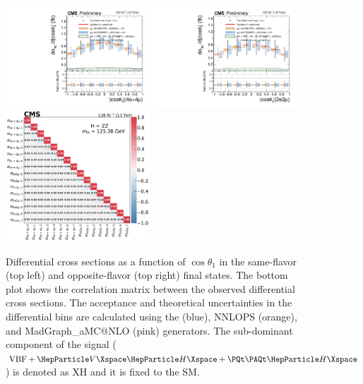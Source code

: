 \clearpage

\begin{center}
	\begin{figure}[!htb]
		\centering
		\includegraphics[width=0.48\textwidth]{Images/H4L/angles/model_v4/costhetaZ1_unfoldwith_4l_SM_125_asimov.pdf}
		\includegraphics[width=0.48\textwidth]{Images/H4L/angles/model_v4/costhetaZ1_unfoldwith_2e2mu_SM_125_asimov.pdf} \\
		\includegraphics[width=0.48\textwidth]{Images/H4L/correlations/corr_costhetaZ1_v4.pdf} \\
		\caption{
			Differential cross sections as a function of $\cos \theta_\text{1}$ in the same-flavor (top left) and opposite-flavor (top right)  final states.
			The bottom plot shows the correlation matrix between the observed differential cross sections.
			The acceptance and theoretical uncertainties in the differential bins are calculated using the \POWHEG (blue), NNLOPS (orange), and MadGraph\_aMC@NLO (pink) generators.
			The sub-dominant component of the signal ($\VBF + \VH + \ttH$) is denoted as XH and it is fixed to the SM.
			\label{fig:fidCOSZ1}}
	\end{figure}
\end{center}

